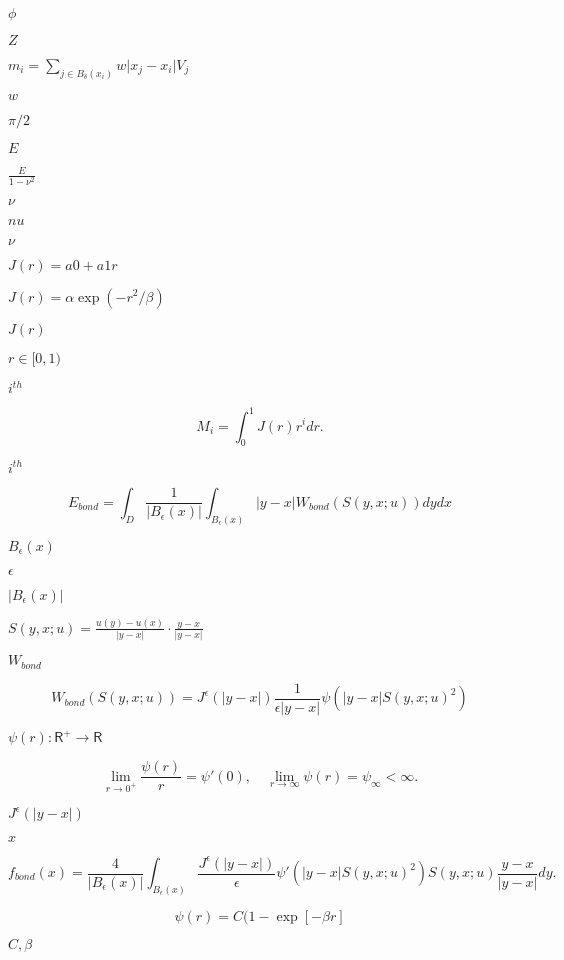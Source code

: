 \documentclass{article}
\begin{document}
$ \phi $
\pagebreak

$ Z $
\pagebreak

$m_i = \sum\limits_{j\in B_\delta(x_i)} w \vert x_j - x_i \vert V_j$
\pagebreak

$w$
\pagebreak

$ \pi/2 $
\pagebreak

$
E$
\pagebreak

$ \frac{E}{1 - \nu^2} $
\pagebreak

$ \nu$
\pagebreak

$ nu$
\pagebreak

$ \nu $
\pagebreak

$ J(r) = a0 + a1 r $
\pagebreak

$ J(r) = \alpha \exp(-r^2/\beta) $
\pagebreak

$ J(r) $
\pagebreak

$ r\in [0,1)$
\pagebreak

$
i^{th} $
\pagebreak

\[ M_i = \int_0^1 J(r) r^i dr. \]
\pagebreak

$
i^{th}$
\pagebreak

\[ E_{bond} = \int_D \frac{1}{|B_\epsilon(x)|} \int_{B_\epsilon(x)} |y-x|
W_{bond}(S(y,x; u)) dy dx \]
\pagebreak

$ B_\epsilon(x) $
\pagebreak

$ \epsilon$
\pagebreak

$ |B_\epsilon(x)| $
\pagebreak

$ S(y,x;u) = \frac{u(y) - u(x)}{|y-x|} \cdot
\frac{y-x}{|y-x|} $
\pagebreak

$ W_{bond} $
\pagebreak

\[ W_{bond} (S(y,x;u)) = J^\epsilon(|y-x|) \frac{1}{\epsilon |y-x|} \psi
(|y-x| S(y,x;u)^2) \]
\pagebreak

$ \psi(r) : \textsf{R}^+ \to \textsf{R} $
\pagebreak

\[ \lim_{r\to 0^+} \frac{\psi(r)}{r} = \psi'(0), \quad \lim_{r\to \infty}
\psi(r) = \psi_\infty < \infty. \]
\pagebreak

$ J^\epsilon(|y-x|)$
\pagebreak

$ x $
\pagebreak

\[ f_{bond}(x) = \frac{4}{|B_\epsilon(x)|} \int_{B_\epsilon(x)}
\frac{J^\epsilon(|y-x|)}{\epsilon} \psi'(|y-x| S(y,x;u)^2) S(y,x;u)
\frac{y-x}{|y-x|} dy.\]
\pagebreak

\[ \psi(r) = C ( 1-\exp[-\beta r] \]
\pagebreak

$ C, \beta $
\pagebreak
\end{document}
